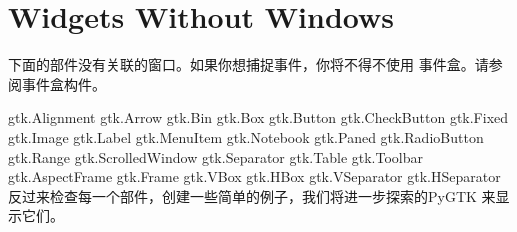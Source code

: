 \section{Widgets Without Windows}
下面的部件没有关联的窗口。如果你想捕捉事件，你将不得不使用
事件盒。请参阅事件盒构件。	

gtk.Alignment
gtk.Arrow
gtk.Bin
gtk.Box
gtk.Button
gtk.CheckButton
gtk.Fixed
gtk.Image
gtk.Label
gtk.MenuItem
gtk.Notebook
gtk.Paned
gtk.RadioButton
gtk.Range
gtk.ScrolledWindow
gtk.Separator
gtk.Table
gtk.Toolbar
gtk.AspectFrame
gtk.Frame
gtk.VBox
gtk.HBox
gtk.VSeparator
gtk.HSeparator
反过来检查每一个部件，创建一些简单的例子，我们将进一步探索的PyGTK
来显示它们。	

